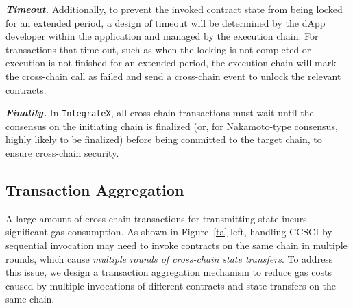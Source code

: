 \textbf{\emph{Timeout.}}
Additionally, to prevent the invoked contract state from being locked for an extended period, a design of timeout will be determined by the dApp developer within the application and managed by the execution chain. 
For transactions that time out, such as when the locking is not completed or execution is not finished for an extended period, the execution chain will mark the cross-chain call as failed and send a cross-chain event to unlock the relevant contracts.

\textbf{\emph{Finality.}}
In \texttt{IntegrateX}, all cross-chain transactions must wait until the consensus on the initiating chain is finalized (or, for Nakamoto-type consensus, highly likely to be finalized) before being committed to the target chain, to ensure cross-chain security.

\subsection{Transaction Aggregation}
\label{subsec:aggregation}

A large amount of cross-chain transactions for transmitting state incurs significant gas consumption. 
As shown in Figure~\ref{ta} left, handling CCSCI by sequential invocation may need to invoke contracts on the same chain in multiple rounds, which cause \emph{multiple rounds of cross-chain state transfers}. 
To address this issue, we design a transaction aggregation mechanism to reduce gas costs caused by multiple invocations of different contracts and state transfers on the same chain.

